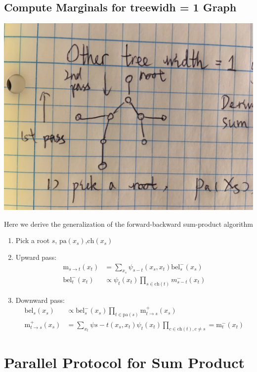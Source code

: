 \documentclass{article}
\newcommand{\pa}{\text{pa}}
\newcommand{\ch}{\text{ch}}
\newcommand{\bel}{\text{bel}}
\newcommand{\m}{\text{m}}
\begin{document}
\subsection{Compute Marginals for treewidh = 1 Graph}
\begin{center}
\includegraphics[scale=0.1]{g2.jpg}
\end{center}
Here we derive the generalization of the forward-backward sum-product algorithm
\begin{enumerate}
\item Pick a root  $s$, $\pa(x_s)$,$\ch(x_s)$
\item Upward pass:
\begin{align*}
\m_{s\rightarrow t}(x_t)&=\sum_{x_s}\psi_{s-t}(x_s,x_t)\bel_s^-(x_s)\\
\bel_t^-(x_t)&\propto \psi_t(x_t)\prod_{s \in \ch(t)} m_{s-t}^-(x_t)
\end{align*}
\item Downward pass:
\begin{align*}
\bel_s(x_s)&\propto \bel_s^-(x_s)\prod_{t \in \pa(s)} \m_{t\rightarrow s}^+(x_s) \\
\m_{t\rightarrow s}^+ (x_s) &= \sum_{x_t} \psi{s-t}(x_s,x_t)\psi_t(x_t)\prod_{c \in \ch(t), c \neq s}=\m_t^-(x_t)
\end{align*}
\end{enumerate}

\section{Parallel Protocol for Sum Product}
\end{document}
